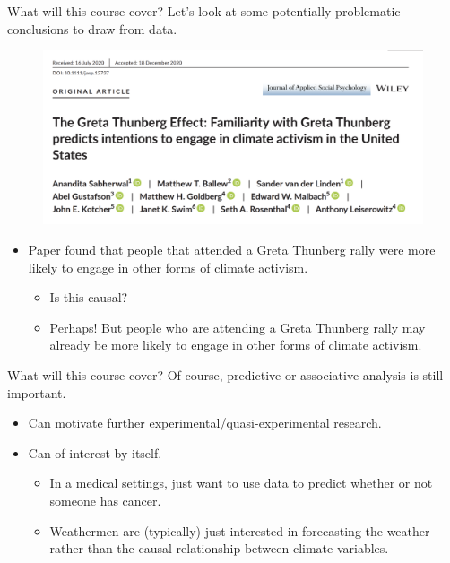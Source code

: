 \documentclass[notheorems,10pt]{beamer}
\begin{document}
\begin{frame}{What will this course cover?} 
	Let's look at some potentially problematic conclusions to draw from data.
	\begin{figure}[htpb]
		\centering
		\includegraphics[width=0.8\linewidth]{greta.png}
	\end{figure}
	\begin{itemize}
		\item Paper found that people that attended a Greta Thunberg rally were more likely to engage in other forms of climate activism. 
		\begin{itemize}
			\item Is this causal?
			\item Perhaps! But people who are attending a Greta Thunberg rally may already be more likely to engage in other forms of climate activism.
		\end{itemize}
	\end{itemize}
\end{frame}
\begin{frame}{What will this course cover?} 
	Of course, predictive or associative analysis is still important.
	\begin{itemize}
		\item<1-> Can motivate further experimental/quasi-experimental research. 
		\item<2-> Can of interest by itself.
		\begin{itemize}
			\item In a medical settings, just want to use data to predict whether or not someone has cancer.
			\item Weathermen are (typically) just interested in forecasting the weather rather than the causal relationship between climate variables.
		\end{itemize}
	\end{itemize}
\end{frame}
\end{document}
